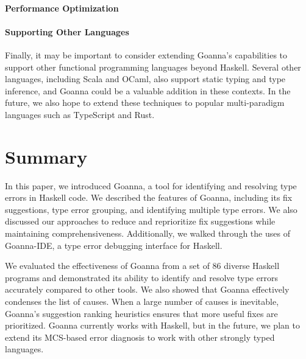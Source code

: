 \documentclass[pdflatex,sn-mathphys-num]{sn-jnl}%
\begin{document}
\paragraph{\textbf{Performance Optimization}}

\paragraph{\textbf{Supporting Other Languages}}
    Finally, it may be important to consider extending Goanna's capabilities to support other functional programming languages beyond Haskell. Several other languages, including Scala and OCaml, also support static typing and type inference, and Goanna could be a valuable addition in these contexts. In the future, we also hope to extend these techniques to popular multi-paradigm languages such as TypeScript and Rust.

  	
  	


    



\section{Summary} \label{sec:conclusion}
In this paper, we introduced Goanna, a tool for identifying and resolving type errors in Haskell code. We described the features of Goanna, including its fix suggestions, type error grouping, and identifying multiple type errors. We also discussed our approaches to reduce and reprioritize fix suggestions while maintaining comprehensiveness. Additionally, we walked through the uses of Goanna-IDE, a type error debugging interface for Haskell.

We evaluated the effectiveness of Goanna from a set of 86 diverse Haskell programs and demonstrated its ability to identify and resolve type errors accurately compared to other tools. We also showed that Goanna effectively condenses the list of causes. When a large number of causes is inevitable, Goanna's suggestion ranking heuristics ensures that more useful fixes are prioritized. Goanna currently works with Haskell, but in the future, we plan to extend its MCS-based error diagnosis to work with other strongly typed languages.

\end{document}

